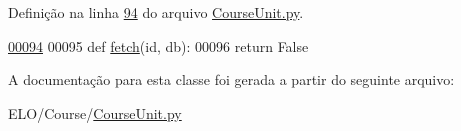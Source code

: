 Definição na linha \hyperlink{CourseUnit_8py_source_l00094}{94} do arquivo \hyperlink{CourseUnit_8py_source}{Course\-Unit.\-py}.


\begin{DoxyCode}
\hypertarget{classCourse_1_1CourseUnit_1_1PersCourse_l00094}{}\hyperlink{classCourse_1_1CourseUnit_1_1PersCourse_a6e682e872daa8d3523015e1b4df76d0f}{00094} 
00095     \textcolor{keyword}{def }\hyperlink{classCourse_1_1CourseUnit_1_1PersCourse_a6e682e872daa8d3523015e1b4df76d0f}{fetch}(id, db):
00096         \textcolor{keywordflow}{return} \textcolor{keyword}{False}
\end{DoxyCode}


A documentação para esta classe foi gerada a partir do seguinte arquivo\-:\begin{DoxyCompactItemize}
\item 
E\-L\-O/\-Course/\hyperlink{CourseUnit_8py}{Course\-Unit.\-py}\end{DoxyCompactItemize}
